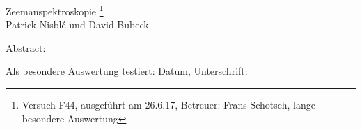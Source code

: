 \thispagestyle{empty}
	\null\vspace{40mm}
	\begin{center}
		{
			\Large Zeemanspektroskopie
			\footnote{
				\noindent Versuch F44, ausgeführt am 26.6.17,
				Betreuer: Frans Schotsch,
				lange besondere Auswertung
			}
		}\\[15mm]
		Patrick Nisblé und David Bubeck

		\vspace{25mm}

		\parbox{0.9\textwidth}{
			Abstract:\\
			\small %
		}
	\end{center}

	\vfill
	Als besondere Auswertung testiert: Datum, Unterschrift:
	\vspace{20mm}
	\newpage
	\null\thispagestyle{empty}
